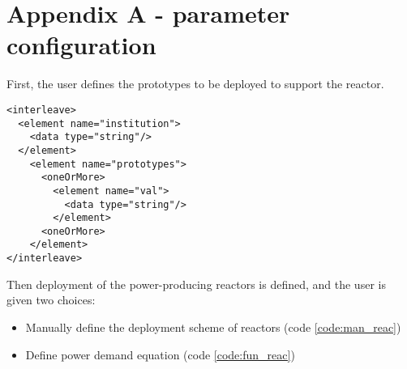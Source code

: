 \documentclass[11pt,letterpaper]{article}
\newenvironment{code}{\captionsetup{type=listing}}{}
\begin{document}
\begin{comment}
\item Do the related fuel cycle facilities exit upon demand decrease?
\begin{verbatim}
TEST(ReactorTests, DDDeploy_NO) {
    [Example input with the following attributes:]
        [int simdur = 20;]
        [Defines reactor with zero refueling cycle and operation 
        cycle of 1 month]
        [Defines fuel cycle facilities parameters]
        [Defines Reactor Deploy Scheme / Power Demand]
        [Decreasing Fuel Demand with Time]
    [Run test]
    [Test if fuel facility is deployed in the beginning]
    [Test if fuel facility exits later in the simulation (have 
    analytic solution)]
}
\end{verbatim}


\end{enumerate}



\section{Advanced Fuel Cycles}
\end{comment}

\section{Appendix A - parameter configuration}

First, the user defines the prototypes to be deployed
to support the reactor.

\begin{code}

\begin{verbatim}
<interleave>
  <element name="institution">
    <data type="string"/>
  </element>
    <element name="prototypes">
      <oneOrMore>
        <element name="val">
          <data type="string"/>
        </element>
      <oneOrMore>
    </element>
</interleave>

\end{verbatim}
\label{code:pro}
\end{code}


Then deployment of the power-producing reactors is defined, and the user
is given two choices:
\begin{itemize}
  \item Manually define the deployment scheme of reactors (code \ref{code:man_reac})
  \item Define power demand equation (code \ref{code:fun_reac})
\end{itemize}
\end{document}
